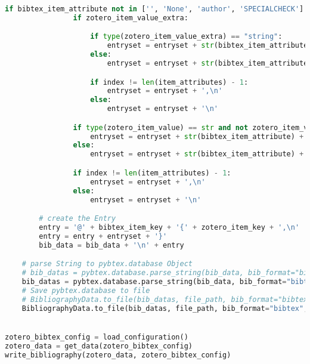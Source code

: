 \begin{lstlisting}[language=python, caption=Python LaTex - zotero.py - Zotero BibLaTex Importer,captionpos=b,label={lst:zotero},breaklines=true]
            if bibtex_item_attribute not in ['', 'None', 'author', 'SPECIALCHECK'] and zotero_item_value not in ['', None, []]:
                if zotero_item_value_extra:

                    if type(zotero_item_value_extra) == "string":
                        entryset = entryset + str(bibtex_item_attribute_extra) + '=\"' + str(zotero_item_value_extra) + '\"'
                    else:
                        entryset = entryset + str(bibtex_item_attribute_extra) + '=' + str(zotero_item_value_extra)

                    if index != len(item_attributes) - 1:
                        entryset = entryset + ',\n'
                    else:
                        entryset = entryset + '\n'

                if type(zotero_item_value) == str and not zotero_item_value.isnumeric():
                    entryset = entryset + str(bibtex_item_attribute) + '=\"' + str(zotero_item_value) + '\"'
                else:
                    entryset = entryset + str(bibtex_item_attribute) + '=' + str(zotero_item_value)

                if index != len(item_attributes) - 1:
                    entryset = entryset + ',\n'
                else:
                    entryset = entryset + '\n'

        # create the Entry
        entry = '@' + bibtex_item_key + '{' + zotero_item_key + ',\n'
        entry = entry + entryset + '}'
        bib_data = bib_data + '\n' + entry

    # parse String to pybtex.database Object
    # bib_datas = pybtex.database.parse_string(bib_data, bib_format="bibtex", encoding='ISO-8859-1')
    bib_datas = pybtex.database.parse_string(bib_data, bib_format="bibtex", encoding='Iutf-8')
    # Save pybtex.database to file
    # BibliographyData.to_file(bib_datas, file_path, bib_format="bibtex", encoding='ISO-8859-1')
    BibliographyData.to_file(bib_datas, file_path, bib_format="bibtex", encoding='utf-8')


zotero_bibtex_config = load_configuration()
zotero_data = get_data(zotero_bibtex_config)
write_bibliography(zotero_data, zotero_bibtex_config)
\end{lstlisting}